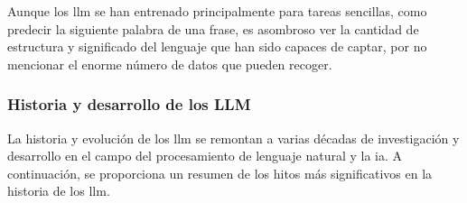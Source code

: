 Aunque los \acrshort{llm}  se han entrenado principalmente para tareas sencillas, como predecir la siguiente palabra de una frase, es asombroso ver la cantidad de estructura y significado del lenguaje que han sido capaces de captar, por no mencionar el enorme número de datos que pueden recoger.

\subsubsection{Historia y desarrollo de los LLM}

La historia y evolución de los \acrshort{llm} se remontan a varias décadas de investigación y desarrollo en el campo del procesamiento de lenguaje natural y la \acrlong{ia}. A continuación, se proporciona un resumen de los hitos más significativos en la historia de los \acrshort{llm}\cite{zhao2023survey,scribbleData,Tolaka}.


